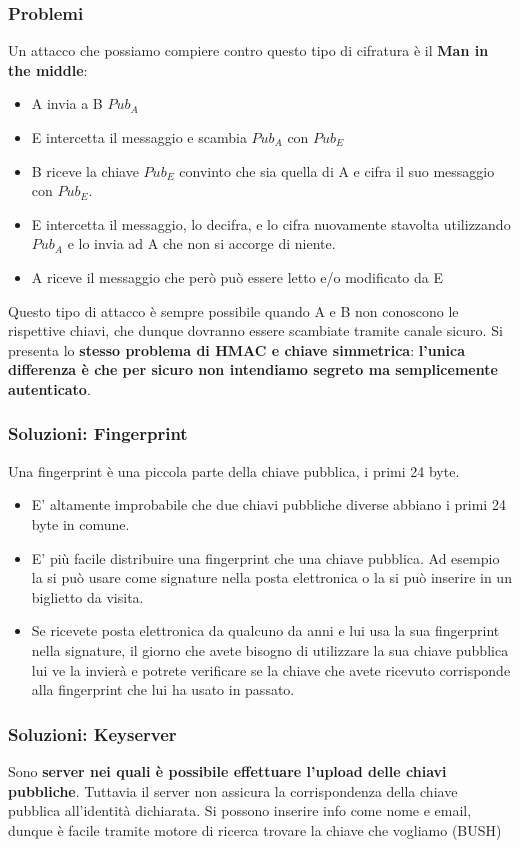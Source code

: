 \documentclass[12pt]{article}
\begin{document}
			\subsubsection{Problemi}
				Un attacco che possiamo compiere contro questo tipo di cifratura è il \textbf{Man in the middle}:
				\begin{itemize}
					\item A invia a B $Pub_{A}$
					\item E intercetta il messaggio e scambia $Pub_{A}$ con $Pub_{E}$
					\item B riceve la chiave $Pub_{E}$ convinto che sia quella di A e cifra il suo messaggio con $Pub_{E}$.
					\item E intercetta il messaggio, lo decifra, e lo cifra nuovamente stavolta utilizzando $Pub_{A}$ e lo invia ad A che non si accorge di niente.
					\item A riceve il messaggio che però può essere letto e/o modificato da E
				\end{itemize}
				Questo tipo di attacco è sempre possibile quando A e B non conoscono le rispettive chiavi, che dunque dovranno essere scambiate tramite canale sicuro. Si presenta lo \textbf{stesso problema di HMAC e chiave simmetrica}: \textbf{l'unica differenza è che per sicuro non intendiamo segreto ma semplicemente autenticato}.
			\subsubsection{Soluzioni: Fingerprint}
				Una fingerprint è una piccola parte della chiave pubblica, i primi 24 byte.
				\begin{itemize}
					\item E’ altamente improbabile che due chiavi pubbliche diverse abbiano i primi
					24 byte in comune.
					\item E’ più facile distribuire una fingerprint che una chiave pubblica. Ad
					esempio la si può usare come signature nella posta elettronica o la si può
					inserire in un biglietto da visita.
					\item Se ricevete posta elettronica da qualcuno da anni e lui usa la sua
					fingerprint nella signature, il giorno che avete bisogno di utilizzare la sua
					chiave pubblica lui ve la invierà e potrete verificare se la chiave che avete
					ricevuto corrisponde alla fingerprint che lui ha usato in passato.
				\end{itemize}
				
			\subsubsection{Soluzioni: Keyserver}
				Sono \textbf{server nei quali è possibile effettuare l'upload delle chiavi pubbliche}. Tuttavia il server non assicura la corrispondenza della chiave pubblica all'identità dichiarata. Si possono inserire info come nome e email, dunque è facile tramite motore di ricerca trovare la chiave che vogliamo (BUSH)
\end{document}
